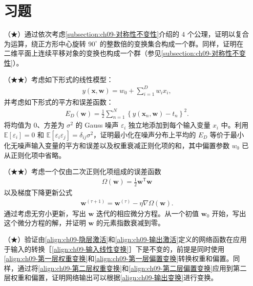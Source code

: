 \documentclass[../../main.tex]{subfiles}
\begin{document}
\section{习题}\label{section:ch09-习题}

\begin{exercise}\label{exercise:ch09-01}
（★）通过依次考虑\cref{subsection:ch09-对称性不变性}介绍的 $4$ 个公理，证明以复合为运算，绕正方形中心旋转 $90^{\circ}$ 的整数倍的变换集合构成一个群。同样，证明在二维平面上连续平移对象的变换也构成一个群（参见\cref{subsection:ch09-对称性不变性}）。
\end{exercise}

\begin{exercise}\label{exercise:ch09-02}
（★★）考虑如下形式的线性模型：
\begin{align}
y(\boldsymbol{x},\boldsymbol{w})=w_{0}+\sum_{i=1}^{D}w_{i}x_{i},
\label{align:ch09-线性模型}
\end{align}
并考虑如下形式的平方和误差函数：
\begin{align}
E_{D}(\boldsymbol{w})=\frac{1}{2}\sum_{n=1}^{N}\left\{y(\boldsymbol{x}_{n},\boldsymbol{w})-t_{n}\right\}^{2}.
\label{align:ch09-平方和误差}
\end{align}
将均值为 $0$、方差为 $\sigma^{2}$ 的 Gauss 噪声 $\varepsilon_{i}$ 独立地添加到每个输入变量 $x_{i}$ 中。利用 $\mathbb{E}[\varepsilon_{i}]=0$ 和 $\mathbb{E}[\varepsilon_{i}\varepsilon_{j}]=\delta_{ij}\sigma^{2}$，证明最小化在噪声分布上平均的 $E_{D}$ 等价于最小化无噪声输入变量的平方和误差以及权重衰减正则化项的和，其中偏置参数 $w_{0}$ 已从正则化项中省略。
\end{exercise}

\begin{exercise}\label{exercise:ch09-03}
（★★）考虑一个仅由二次正则化项组成的误差函数
\begin{align}
\Omega(\boldsymbol{w})=\frac{1}{2}\boldsymbol{w}^{\mathsf T}\boldsymbol{w}
\label{align:ch09-二次正则}
\end{align}
以及梯度下降更新公式
\begin{align}
\boldsymbol{w}^{(\tau+1)}=\boldsymbol{w}^{(\tau)}-\eta\nabla\Omega(\boldsymbol{w}).
\label{align:ch09-梯度更新}
\end{align}
通过考虑无穷小更新，写出 $\boldsymbol{w}$ 迭代的相应微分方程。从一个初值 $\boldsymbol{w}_{0}$ 开始，写出这个微分方程的解，并证明 $\boldsymbol{w}$ 的元素指数衰减到零。
\end{exercise}

\begin{exercise}\label{exercise:ch09-04}
（★）验证由\eqref{align:ch09-隐层激活}和\eqref{align:ch09-输出激活}定义的网络函数在应用于输入的转换［\eqref{align:ch09-输入线性变换}］下是不变的，前提是同时使用\eqref{align:ch09-第一层权重变换}和\eqref{align:ch09-第一层偏置变换}转换权重和偏置。同样，通过将\eqref{align:ch09-第二层权重变换}和\eqref{align:ch09-第二层偏置变换}应用到第二层权重和偏置，证明网络输出可以根据\eqref{align:ch09-输出变换}进行变换。
\end{exercise}
\end{document}

